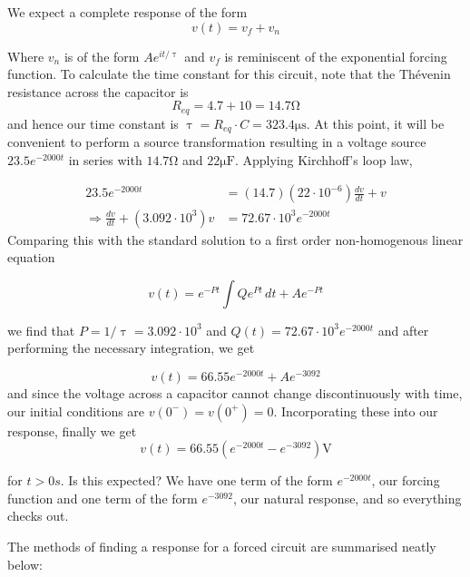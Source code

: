 \documentclass[11pt]{article}
\numberwithin{equation}{section}
\begin{document}
\begin{flushleft}
\begin{tcolorbox}[colback=green!5, colframe=green!75!black, title=\textbf{Example 2.3}, breakable]
We expect a complete response of the form
\begin{equation*}
v(t) = v_f + v_n
\end{equation*}

Where $v_n$ is of the form $Ae^{it/\uptau}$ and $v_f$ is reminiscent of the exponential forcing function. To calculate the time constant for this
circuit, note that the Th\'{e}venin resistance across the capacitor is
\begin{equation*}
 R_{eq} = 4.7 + 10 = 14.7\si{\ohm}
\end{equation*}
and hence our time constant is $\uptau = R_{eq} \cdot C = 323.4 \si{\micro\second}$. At this point, it will be convenient to perform a source transformation
resulting in a voltage source $23.5e^{-2000t}$ in series with $14.7\si{\ohm}$ and $22 \si{\micro\farad}$. Applying Kirchhoff's loop law,

\begin{align*}
23.5e^{-2000t} &= (14.7)(22\cdot 10^{-6})\frac{dv}{dt} + v\\
\Rightarrow \frac{dv}{dt} + (3.092\cdot 10^{3})v &= 72.67\cdot 10^{3}e^{-2000t}
\end{align*}
Comparing this with the standard solution to a first order non-homogenous linear equation

\begin{equation*}
v(t) = e^{-Pt}\int Qe^{Pt}\, dt + Ae^{-Pt}
\end{equation*}

we find that $P=1/\uptau=3.092\cdot 10^{3}$ and $Q(t)=72.67\cdot 10^{3}e^{-2000t}$ and after performing the necessary integration, we get

\begin{equation*}
 v(t) = 66.55e^{-2000t} + Ae^{-3092}
\end{equation*}
and since the voltage across a capacitor cannot change discontinuously with time, our initial conditions are $v(0^-)=v(0^+)=0$. Incorporating
these into our response, finally we get
\begin{equation*}
 v(t) = 66.55(e^{-2000t} - e^{-3092})\si{\volt}
\end{equation*}

for $t>0s$. Is this expected? We have one term of the form $e^{-2000t}$, our forcing function and one term of the form $e^{-3092}$, our natural
response, and so everything checks out.

\end{tcolorbox}

The methods of finding a response for a forced circuit are summarised neatly below:\\~\\


\end{flushleft}
\end{document}
